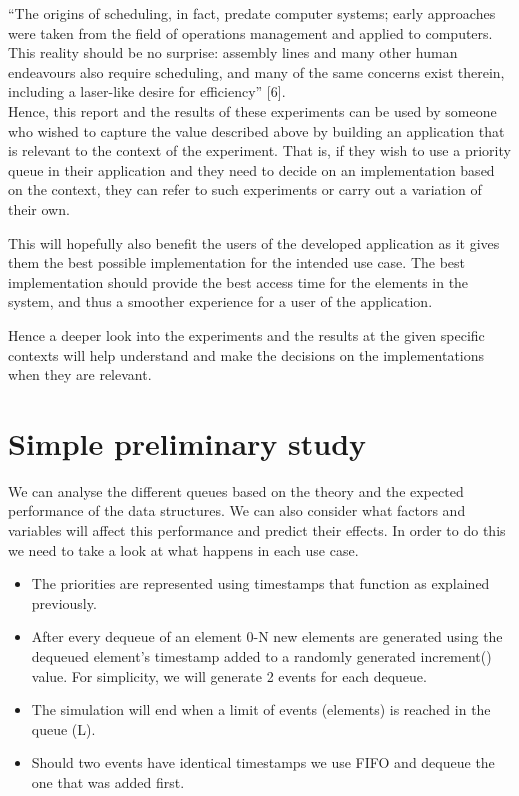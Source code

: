 \documentclass[12pt]{article}
\begin{document}
“The origins of scheduling, in fact, predate computer systems; early approaches were taken from the field of operations management and applied to computers. This reality should be no surprise: assembly lines and many other human endeavours also require scheduling, and many of the same concerns exist therein, including a laser-like desire for efficiency” [6]. 
\\

Hence, this report and the results of these experiments can be used by someone who wished to capture the value described above by building an application that is relevant to the context of the experiment. That is, if they wish to use a priority queue in their application and they need to decide on an implementation based on the context, they can refer to such experiments or carry out a variation of their own. 

This will hopefully also benefit the users of the developed application as it gives them the best possible implementation for the intended use case. The best implementation should provide the best access time for the elements in the system, and thus a smoother experience for a user of the application.

Hence a deeper look into the experiments and the results at the given specific contexts will help understand and make the decisions on the implementations when they are relevant. 


\section{Simple preliminary study}

We can analyse the different queues based on the theory and the expected performance of the data structures. We can also consider what factors and variables will affect this performance and predict their effects. In order to do this we need to take a look at what happens in each use case. 

\begin{itemize}
   \item The priorities are represented using timestamps that function as explained previously. 
   \item After every dequeue of an element 0-N new elements are generated using the dequeued element’s timestamp added to a randomly generated increment() value. For simplicity, we will generate 2 events for each dequeue. 
   \item The simulation will end when a limit of events (elements) is reached in the queue (L).
   \item Should two events have identical timestamps we use FIFO and dequeue the one that was added first. 
\end{itemize}
\end{document}
